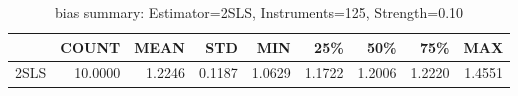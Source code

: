 \begin{table}[ht]
\centering
\caption{bias summary: Estimator=2SLS, Instruments=125, Strength=0.10}
\begin{tabular}{lrrrrrrrr}
\toprule
 & COUNT & MEAN & STD & MIN & 25\% & 50\% & 75\% & MAX \\
\midrule
2SLS & 10.0000 & 1.2246 & 0.1187 & 1.0629 & 1.1722 & 1.2006 & 1.2220 & 1.4551 \\
\bottomrule
\end{tabular}
\end{table}

